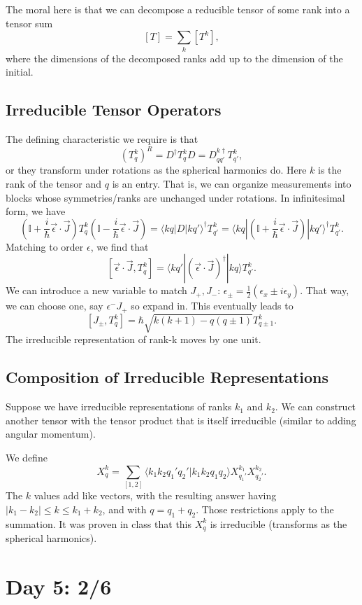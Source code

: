 \documentclass[fontsize=12pt]{scrartcl}
\newcommand{\bb}[1]{\mathbb{#1}}
\newcommand{\Id}{\bb{I}}
\newcommand{\la}{\langle}
\newcommand{\ra}{\rangle}
\begin{document}
The moral here is that we can decompose a reducible tensor of some rank into a tensor sum $$[T]=\sum_k[T^k],$$ where the dimensions of the decomposed ranks add up to the dimension of the initial.

\subsection{Irreducible Tensor Operators}

The defining characteristic we require is that $$\left(T^k_q\right)^R=D^\dagger T_q^k D = D_{qq'}^{k\dagger}T_{q'}^k,$$ or they transform under rotations as the spherical harmonics do. Here $k$ is the rank of the tensor and $q$ is an entry. That is, we can organize measurements into blocks whose symmetries/ranks are unchanged under rotations. In infinitesimal form, we have $$\left(\Id+\frac{i}{\hbar}\vec{\epsilon}\cdot\vec{J}\right)T_q^k \left(\Id-\frac{i}{\hbar}\vec{\epsilon}\cdot\vec{J}\right) = \la kq|D|kq'\ra^\dagger T_{q'}^k=\la kq| \left(\Id+\frac{i}{\hbar}\vec{\epsilon}\cdot\vec{J}\right) | kq'\ra^\dagger T_{q'}^k.$$ Matching to order $\epsilon$, we find that $$[\vec{\epsilon}\cdot\vec{J},T_q^k]=\la kq' | (\vec{\epsilon}\cdot\vec{J})^\dagger|kq\ra T_{q'}^k.$$ We can introduce a new variable to match $J_+,J_-$: $\epsilon_{\pm}=\frac{1}{2}(\epsilon_x\pm i\epsilon_y)$. That way, we can choose one, say $\epsilon^-J_+$ so expand in. This eventually leads to $$[J_\pm, T_q^k]=\hbar \sqrt{k(k+1)-q(q\pm 1)} T^k_{q\pm 1}.$$ The irreducible representation of rank-k moves by one unit.

\subsection{Composition of Irreducible Representations}

Suppose we have irreducible representations of ranks $k_1$ and $k_2$. We can construct another tensor with the tensor product that is itself irreducible (similar to adding angular momentum).

We define $$X_q^k = \sum_{[1,2]} \la k_1 k_2 q_1'q_2'|k_1k_2 q_1q_2\ra X_{q_1'}^{k_1}X_{q_2'}^{k_2}.$$ The $k$ values add like vectors, with the resulting answer having $|k_1-k_2|\leq k\leq k_1+k_2$, and with $q=q_1+q_2$. Those restrictions apply to the summation. It was proven in class that this $X_q^k$ is irreducible (transforms as the spherical harmonics).


\section{Day 5: 2/6}
\end{document}
